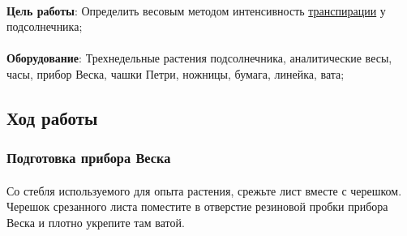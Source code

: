 	

\begin{footnotesize}

\paragraph*{}\textbf{Цель работы}: Определить весовым методом \hypertarget{lab_transp_level}{интенсивность} \hyperlink{transpiration}{транспирации} у подсолнечника;

\paragraph*{}\textbf{Оборудование}: Трехнедельные растения подсолнечника, аналитические весы, часы, прибор Веска, чашки Петри, ножницы, бумага, линейка, вата;

\end{footnotesize}

\subsection*{Ход работы}

\subsubsection*{Подготовка прибора Веска}

\paragraph*{}Со стебля используемого для опыта растения, срежьте лист вместе с черешком. Черешок срезанного листа поместите в отверстие резиновой пробки прибора Веска и  плотно укрепите там ватой. 

